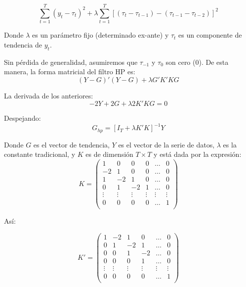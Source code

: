 \documentclass[
]{book}
\begin{document}
\begin{equation}
  \sum_{t=1}^T (y_t - \tau_t)^2 + \lambda \sum_{t=1}^{T} [(\tau_{t} - \tau_{t-1}) - (\tau_{t-1} - \tau_{t-2})]^2
\end{equation}

Donde \(\lambda\) es un parámetro fijo (determinado ex-ante) y \(\tau_t\) es un componente de tendencia de \(y_t\).

Sin pérdida de generalidad, asumiremos que \(\tau_{-1}\) y \(\tau_{0}\) son cero (0). De esta manera, la forma matricial del filtro HP es:
\begin{equation}
  (Y - G)'(Y - G) + \lambda G' K' K G
\end{equation}

La derivada de los anteriores:
\begin{equation}
  -2 Y + 2 G + \lambda 2 K' K G = 0
\end{equation}

Despejando:
\begin{equation}
  G_{hp} = [I_T + \lambda K' K]^{-1} Y
\end{equation}

Donde \(G\) es el vector de tendencia, \(Y\) es el vector de la serie de datos, \(\lambda\) es la constante tradicional, y \(K\) es de dimensión \(T \times T\) y está dada por la expresión:
\begin{equation}
  K =
  \begin{pmatrix}
  1 & 0 & 0 & 0 & \ldots & 0 \\
  -2 & 1 & 0 & 0 & \ldots & 0 \\
  1 & -2 & 1 & 0 & \ldots & 0 \\
  0 & 1 & -2 & 1 & \ldots & 0 \\
  \vdots & \vdots &  \vdots &  \vdots &  \vdots &  \vdots \\
  0 & 0 & 0 & 0 & \ldots & 1 \\
  \end{pmatrix}
\end{equation}

Así:

\begin{equation}
  K' =
  \begin{pmatrix}
  1 & -2 & 1 & 0 & \ldots & 0 \\
  0 & 1 & -2 & 1 & \ldots & 0 \\
  0 & 0 & 1 & -2 & \ldots & 0 \\
  0 & 0 & 0 & 1 & \ldots & 0 \\
  \vdots & \vdots &  \vdots &  \vdots &  \vdots &  \vdots \\
  0 & 0 & 0 & 0 & \ldots & 1 \\
  \end{pmatrix}
\end{equation}
\end{document}
